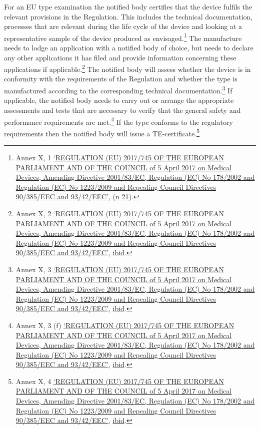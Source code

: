 \documentclass[
]{scrartcl}
\begin{document}
For an EU type examination the notified body certifies that the device fulfils the relevant provisions in the Regulation. This includes the technical documentation, processes that are relevant during the life cycle of the device and looking at a representative sample of the device produced as envisaged.\footnote{Annex X, 1 \protect\hyperlink{ref-REGULATIONEU2017a}{{`{REGULATION} ({EU}) 2017/745 {OF THE EUROPEAN PARLIAMENT AND OF THE COUNCIL} of 5 {April} 2017 on Medical Devices, Amending {Directive} 2001/83/{EC}, {Regulation} ({EC}) {No} 178/2002 and {Regulation} ({EC}) {No} 1223/2009 and Repealing {Council Directives} 90/385/{EEC} and 93/42/{EEC}'}}, \protect\hyperlink{ref-REGULATIONEU2017a}{(n 21)}.} The manufacture needs to lodge an application with a notified body of choice, but needs to declare any other applications it has filed and provide information concerning these applications if applicable.\footnote{Annex X, 2 \protect\hyperlink{ref-REGULATIONEU2017a}{{`{REGULATION} ({EU}) 2017/745 {OF THE EUROPEAN PARLIAMENT AND OF THE COUNCIL} of 5 {April} 2017 on Medical Devices, Amending {Directive} 2001/83/{EC}, {Regulation} ({EC}) {No} 178/2002 and {Regulation} ({EC}) {No} 1223/2009 and Repealing {Council Directives} 90/385/{EEC} and 93/42/{EEC}'}}, \protect\hyperlink{ref-REGULATIONEU2017a}{ibid}.} The notified body will assess whether the device is in conformity with the requirements of the Regulation and whether the type is manufactured according to the corresponding technical documentation.\footnote{Annex X, 3 \protect\hyperlink{ref-REGULATIONEU2017a}{{`{REGULATION} ({EU}) 2017/745 {OF THE EUROPEAN PARLIAMENT AND OF THE COUNCIL} of 5 {April} 2017 on Medical Devices, Amending {Directive} 2001/83/{EC}, {Regulation} ({EC}) {No} 178/2002 and {Regulation} ({EC}) {No} 1223/2009 and Repealing {Council Directives} 90/385/{EEC} and 93/42/{EEC}'}}, \protect\hyperlink{ref-REGULATIONEU2017a}{ibid}.} If applicable, the notified body needs to carry out or arrange the appropriate assessments and tests that are necessary to verify that the general safety and performance requirements are met.\footnote{Annex X, 3 (f) \protect\hyperlink{ref-REGULATIONEU2017a}{{`{REGULATION} ({EU}) 2017/745 {OF THE EUROPEAN PARLIAMENT AND OF THE COUNCIL} of 5 {April} 2017 on Medical Devices, Amending {Directive} 2001/83/{EC}, {Regulation} ({EC}) {No} 178/2002 and {Regulation} ({EC}) {No} 1223/2009 and Repealing {Council Directives} 90/385/{EEC} and 93/42/{EEC}'}}, \protect\hyperlink{ref-REGULATIONEU2017a}{ibid}.} If the type conforms to the regulatory requirements then the notified body will issue a TE-certificate.\footnote{Annex X, 4 \protect\hyperlink{ref-REGULATIONEU2017a}{{`{REGULATION} ({EU}) 2017/745 {OF THE EUROPEAN PARLIAMENT AND OF THE COUNCIL} of 5 {April} 2017 on Medical Devices, Amending {Directive} 2001/83/{EC}, {Regulation} ({EC}) {No} 178/2002 and {Regulation} ({EC}) {No} 1223/2009 and Repealing {Council Directives} 90/385/{EEC} and 93/42/{EEC}'}}, \protect\hyperlink{ref-REGULATIONEU2017a}{ibid}.}
\end{document}
